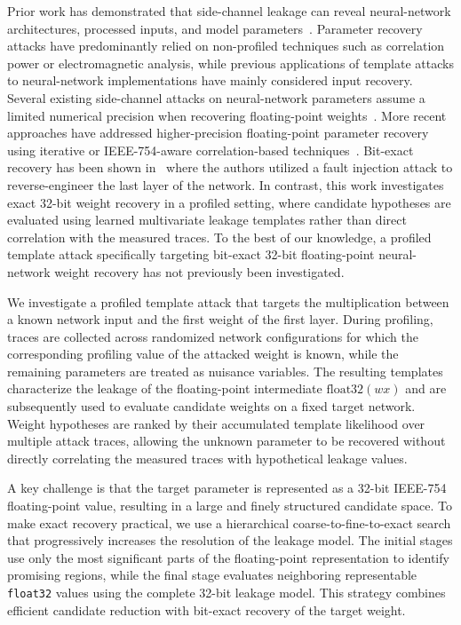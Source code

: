 \documentclass[conference]{IEEEtran}
\begin{document}
Prior work has demonstrated that side-channel leakage can reveal neural-network architectures, processed inputs, and model parameters~\cite{batina2019csi,wei2018know,joud2022practical,nozaki2024power}.
Parameter recovery attacks have predominantly relied on non-profiled techniques such as correlation power or electromagnetic analysis, while previous applications of template attacks to neural-network implementations have mainly considered input recovery.
Several existing side-channel attacks on neural-network parameters assume a limited numerical precision when recovering floating-point weights~\cite{batina2019csi,puvskavc2025make}.
More recent approaches have addressed higher-precision floating-point parameter recovery using iterative or IEEE-754-aware correlation-based techniques~\cite{joud2022practical,nozaki2024power}.
Bit-exact recovery has been shown in~\cite{breier2021sniff} where the authors utilized a fault injection attack to reverse-engineer the last layer of the network.
In contrast, this work investigates exact 32-bit weight recovery in a profiled setting, where candidate hypotheses are evaluated using learned multivariate leakage templates rather than direct correlation with the measured traces.
To the best of our knowledge, a profiled template attack specifically targeting bit-exact 32-bit floating-point neural-network weight recovery has not previously been investigated.

We investigate a profiled template attack that targets the multiplication between a known network input and the first weight of the first layer.
During profiling, traces are collected across randomized network configurations for which the corresponding profiling value of the attacked weight is known, while the remaining parameters are treated as nuisance variables.
The resulting templates characterize the leakage of the floating-point intermediate $\mathrm{float32}(wx)$ and are subsequently used to evaluate candidate weights on a fixed target network.
Weight hypotheses are ranked by their accumulated template likelihood over multiple attack traces, allowing the unknown parameter to be recovered without directly correlating the measured traces with hypothetical leakage values.

A key challenge is that the target parameter is represented as a 32-bit IEEE-754 floating-point value, resulting in a large and finely structured candidate space.
To make exact recovery practical, we use a hierarchical coarse-to-fine-to-exact search that progressively increases the resolution of the leakage model.
The initial stages use only the most significant parts of the floating-point representation to identify promising regions, while the final stage evaluates neighboring representable \texttt{float32} values using the complete 32-bit leakage model.
This strategy combines efficient candidate reduction with bit-exact recovery of the target weight.
\end{document}
